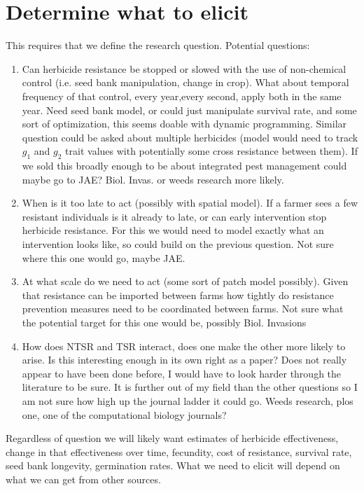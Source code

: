 \documentclass[12pt, a4paper]{article}
\begin{document}
\section{Determine what to elicit}
This requires that we define the research question.
Potential questions:
\begin{enumerate}
	\item Can herbicide resistance be stopped or slowed with the use of non-chemical control (i.e. seed bank manipulation, change in crop). What about temporal frequency of that control, every year,every second, apply both in the same year. Need seed bank model, or could just manipulate survival rate, and some sort of optimization, this seems doable with dynamic programming. Similar question could be asked about multiple herbicides (model would need to track $g_1$ and $g_2$ trait values with potentially some cross resistance between them). If we sold this broadly enough to be about integrated pest management could maybe go to JAE? Biol. Invas. or weeds research more likely.     
	\item When is it too late to act (possibly with spatial model). If a farmer sees a few resistant individuals is it already to late, or can early intervention stop herbicide resistance. For this we would need to model exactly what an intervention looks like, so could build on the previous question. Not sure where this one would go, maybe JAE.  
	\item At what scale do we need to act (some sort of patch model possibly). Given that resistance can be imported between farms how tightly do resistance prevention measures need to be coordinated between farms. Not sure what the potential target for this one would be, possibly Biol. Invasions    
	\item How does NTSR and TSR interact, does one make the other more likely to arise. Is this interesting enough in its own right as a paper? Does not really appear to have been done before, I would have to look harder through the literature to be sure. It is further out of my field than the other questions so I am not sure how high up the journal ladder it could go. Weeds research, plos one, one of the computational biology journals?  
\end{enumerate}

Regardless of question we will likely want estimates of herbicide effectiveness, change in that effectiveness over time, fecundity, cost of resistance, survival rate, seed bank longevity, germination rates. What we need to elicit will depend on what we can get from other sources. 
	
\end{document}
